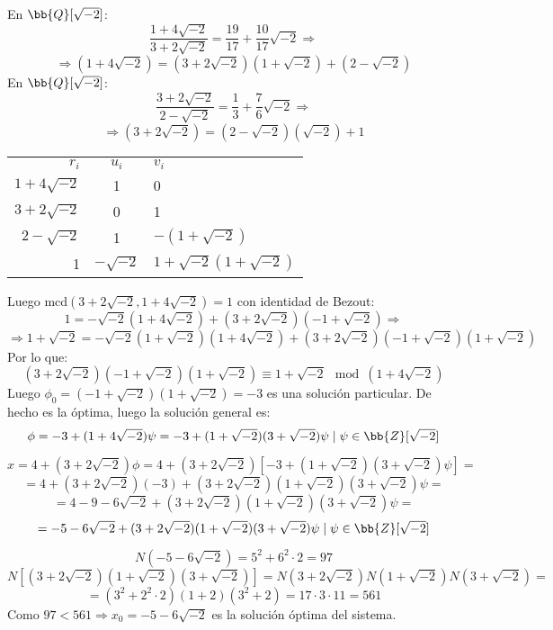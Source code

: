 \documentclass[12pt]{article}
\newcounter{ejercicio}[section] %
\newcounter{ejercicio}
\begin{document}
\begin{ejercicio}[2.5 puntos]
        \noindent
        En $\bb{Q}[\sqrt{-2}]$:
        $$\dfrac{1+4\sqrt{-2}}{3+2\sqrt{-2}} = \dfrac{19}{17} + \dfrac{10}{17}\sqrt{-2} \Rightarrow$$
        $$\Rightarrow (1+4\sqrt{-2}) = (3+2\sqrt{-2})(1+\sqrt{-2}) + (2-\sqrt{-2})$$
        En $\bb{Q}[\sqrt{-2}]$:
        $$\dfrac{3+2\sqrt{-2}}{2-\sqrt{-2}} = \dfrac{1}{3} + \dfrac{7}{6}\sqrt{-2} \Rightarrow$$
        $$\Rightarrow (3+2\sqrt{-2}) = (2-\sqrt{-2})(\sqrt{-2})+1$$
        \begin{center}
        \begin{tabular}{rcl}
            $r_i$ & $u_i$ & $v_i$ \\
            $1+4\sqrt{-2}$ & 1 & 0 \\
            $3+2\sqrt{-2}$ & 0 & 1 \\
            $2-\sqrt{-2}$ & 1 & $-(1+\sqrt{-2})$ \\
            1 & $-\sqrt{-2}$ & $1+\sqrt{-2}(1+\sqrt{-2})$
        \end{tabular}
        \end{center}

        \noindent
        Luego mcd$(3+2\sqrt{-2}, 1+4\sqrt{-2})=1$ con identidad de Bezout:
        $$1 = -\sqrt{-2}(1+4\sqrt{-2}) + (3+2\sqrt{-2})(-1+\sqrt{-2}) \Rightarrow$$
        $$\Rightarrow 1+\sqrt{-2} = -\sqrt{-2}(1+\sqrt{-2})(1+4\sqrt{-2}) + (3+2\sqrt{-2})(-1+\sqrt{-2})(1+\sqrt{-2})$$
        Por lo que:
        $$(3+2\sqrt{-2})(-1+\sqrt{-2})(1+\sqrt{-2}) \equiv 1+\sqrt{-2} \mod (1+4\sqrt{-2})$$
        Luego $\phi_0 = (-1+\sqrt{-2})(1+\sqrt{-2}) = -3$ es una solución particular.\newline
        De hecho es la óptima, luego la solución general es:
        $$\phi = -3 + (1+4\sqrt{-2})\psi = -3 + (1+\sqrt{-2})(3+\sqrt{-2})\psi \mid \psi \in \bb{Z}[\sqrt{-2}]$$

        $$x = 4+(3+2\sqrt{-2})\phi = 4+(3+2\sqrt{-2})[-3+(1+\sqrt{-2})(3+\sqrt{-2})\psi] = $$
        $$ = 4+(3+2\sqrt{-2})(-3) + (3+2\sqrt{-2})(1+\sqrt{-2})(3+\sqrt{-2})\psi = $$
        $$ = 4-9-6\sqrt{-2} + (3+2\sqrt{-2})(1+\sqrt{-2})(3+\sqrt{-2})\psi = $$
        $$ = -5-6\sqrt{-2} + (3+2\sqrt{-2})(1+\sqrt{-2})(3+\sqrt{-2})\psi \mid \psi \in \bb{Z}[\sqrt{-2}]$$


        $$N(-5-6\sqrt{-2}) = 5^2 + 6^2 \cdot 2 = 97$$
        $$N[(3+2\sqrt{-2})(1+\sqrt{-2})(3+\sqrt{-2})] = N(3+2\sqrt{-2})N(1+\sqrt{-2})N(3+\sqrt{-2}) = $$
        $$= (3^2 + 2^2 \cdot 2)(1+2)(3^2 + 2) = 17 \cdot 3 \cdot 11 = 561$$
        Como $97 < 561 \Rightarrow x_0 = -5-6\sqrt{-2}$ es la solución óptima del sistema.\\


\end{ejercicio}
\end{document}
